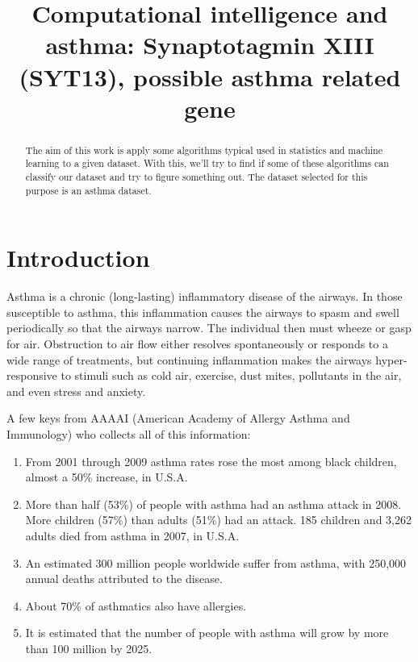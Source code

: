 \documentclass[conference,a4paper]{IEEEtran}
\title{Computational intelligence and asthma: Synaptotagmin XIII (SYT13), possible asthma related gene}
\author{\IEEEauthorblockN{Pablo Vicente-Munuera}
	\IEEEauthorblockA{Bioinformatics MSc\\
		Email: pablovm1990@gmail.com}
}
\begin{document}
\maketitle

\begin{abstract}

The aim of this work is apply some algorithms typical used in statistics and machine learning to a given dataset. With this, we'll try to find if some of these algorithms can classify our dataset and try to figure something out. The dataset selected for this purpose is an asthma dataset.

\end{abstract}

\section{Introduction}

Asthma is a chronic (long-lasting) inflammatory disease of the airways. In those susceptible to asthma, this inflammation causes the airways to spasm and swell periodically so that the airways narrow. The individual then must wheeze or gasp for air. Obstruction to air flow either resolves spontaneously or responds to a wide range of treatments, but continuing inflammation makes the airways hyper-responsive to stimuli such as cold air, exercise, dust mites, pollutants in the air, and even stress and anxiety.

A few keys from AAAAI (American Academy of Allergy Asthma and Immunology)\cite{AAAAI} who collects all of this information:

\begin{enumerate}
	\item From 2001 through 2009 asthma rates rose the most among black children, almost a 50\% increase, in U.S.A. \cite{asthmaUSA}
	
	\item More than half (53\%) of people with asthma had an asthma attack in 2008. More children (57\%) than adults (51\%) had an attack. 185 children and 3,262 adults died from asthma in 2007, in U.S.A. \cite{asthmaUSA}

	\item An estimated 300 million people worldwide suffer from asthma, with 250,000 annual deaths attributed to the disease.\cite{asthmaGlobal}
	
	\item About 70\% of asthmatics also have allergies.\cite{asthmaGlobal}
	
	\item It is estimated that the number of people with asthma will grow by more than 100 million by 2025. \cite{asthmaGlobal}
\end{enumerate}
\end{document}
